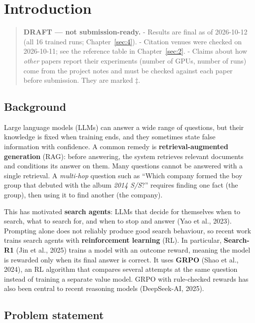 \chapter{Introduction}\label{sec:1}

\begin{quote}
\textbf{DRAFT --- not submission-ready.} - Results are final as of
2026-10-12 (all 16 trained runs; Chapter~\ref{sec:4}). - Citation venues
were checked on 2026-10-11; see the reference table in
Chapter~\ref{sec:2}. - Claims about how \emph{other} papers report their
experiments (number of GPUs, number of runs) come from the project notes
and must be checked against each paper before submission. They are
marked ‡.
\end{quote}

\section{Background}\label{sec:1.1}

Large language models (LLMs) can answer a wide range of questions, but
their knowledge is fixed when training ends, and they sometimes state
false information with confidence. A common remedy is
\textbf{retrieval-augmented generation} (RAG): before answering, the
system retrieves relevant documents and conditions its answer on them.
Many questions cannot be answered with a single retrieval. A
\emph{multi-hop} question such as ``Which company formed the boy group
that debuted with the album \emph{2014 S/S}?'' requires finding one fact
(the group), then using it to find another (the company).

This has motivated \textbf{search agents}: LLMs that decide for
themselves when to search, what to search for, and when to stop and
answer (Yao et al., 2023). Prompting alone does not reliably produce
good search behaviour, so recent work trains search agents with
\textbf{reinforcement learning} (RL). In particular, \textbf{Search-R1}
(Jin et al., 2025) trains a model with an outcome reward, meaning the
model is rewarded only when its final answer is correct. It uses
\textbf{GRPO} (Shao et al., 2024), an RL algorithm that compares several
attempts at the same question instead of training a separate value
model. GRPO with rule-checked rewards has also been central to recent
reasoning models (DeepSeek-AI, 2025).

\section{Problem statement}\label{sec:1.2}

